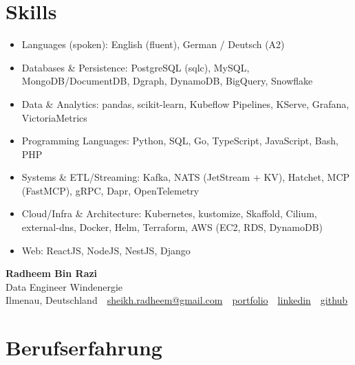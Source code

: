 \documentclass[10pt,a4paper]{resume}
\makeatletter
\newcommand{\Portfolio}{https://radheem.github.io/my-cv}
\newcommand{\PortfolioText}{portfolio}
\newcommand{\GitHub}{https://github.com/radheem}
\newcommand{\LinkedIn}{https://www.linkedin.com/in/radheem-razi}
\newcommand{\Email}{sheikh.radheem@gmail.com}
\makeatother
\begin{document}
\section{Skills}

\begin{itemize}[leftmargin=1.4em,nosep,topsep=2pt]
  \item Languages (spoken): English (fluent), German / Deutsch (A2)
  \item Databases \& Persistence: PostgreSQL (sqlc), MySQL, MongoDB/DocumentDB, Dgraph, DynamoDB, BigQuery, Snowflake
  \item Data \& Analytics: pandas, scikit-learn, Kubeflow Pipelines, KServe, Grafana, VictoriaMetrics
  \item Programming Languages: Python, SQL, Go, TypeScript, JavaScript, Bash, PHP
  \item Systems \& ETL/Streaming: Kafka, NATS (JetStream + KV), Hatchet, MCP (FastMCP), gRPC, Dapr, OpenTelemetry
  \item Cloud/Infra \& Architecture: Kubernetes, kustomize, Skaffold, Cilium, external-dns, Docker, Helm, Terraform, AWS (EC2, RDS, DynamoDB)
  \item Web: ReactJS, NodeJS, NestJS, Django
\end{itemize}

\clearpage
{}

\begin{center}
  {\huge\bfseries Radheem Bin Razi}\\[3pt]
  {\large Data Engineer Windenergie}\\[6pt]
  \small
  Ilmenau, Deutschland \,\textbar\,
  \href{mailto:\Email}{\Email} \,\textbar\,
  \href{\Portfolio}{\PortfolioText} \,\textbar\,
  \href{\LinkedIn}{linkedin} \,\textbar\,
  \href{\GitHub}{github}
\end{center}
\vspace{2pt}

\section{Berufserfahrung}
\end{document}
